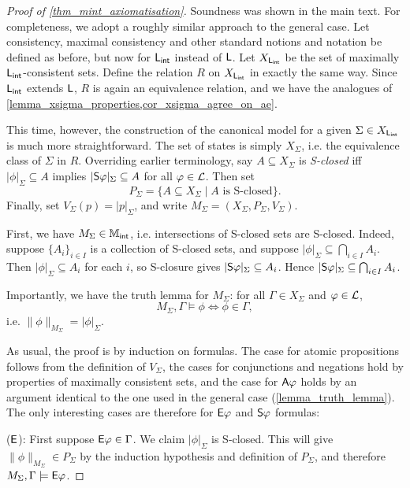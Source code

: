 \begin{proof}[Proof of \cref{thm_mint_axiomatisation}]

Soundness was shown in the main text. For completeness, we adopt a roughly
similar approach to the general case. Let consistency, maximal consistency and
other standard notions and notation be defined as before, but now for $\sLint$
instead of $\sL$. Let $X_{\sLint}$ be the set of maximally $\sLint$-consistent
sets. Define the relation $R$ on $X_{\sLint}$ in exactly the same way. Since
$\sLint$ extends $\sL$, $R$ is again an equivalence relation, and we have the
analogues of \cref{lemma_xsigma_properties,cor_xsigma_agree_on_ae}.

This time, however, the construction of the canonical model for a given
$\Sigma \in X_{\sLint}$ is much more straightforward. The set of
states is simply $X_\Sigma$, i.e. the equivalence class of
$\Sigma$ in $R$. Overriding earlier terminology, say $A
\subseteq X_\Sigma$ is \emph{S-closed} iff $|\phi|_\Sigma \subseteq A$
implies $|\S\phi|_\Sigma \subseteq A$ for all $\phi \in \cL$.
Then set
\[
    P_\Sigma = \{A \subseteq X_\Sigma \mid A \text{ is S-closed}\}.
\]
Finally, set $V_\Sigma(p) = |p|_\Sigma$, and write $M_\Sigma
= (X_\Sigma, P_\Sigma, V_\Sigma)$.

First, we have $M_\Sigma \in \Mint$, i.e. intersections of S-closed sets are
S-closed.  Indeed, suppose $\{A_i\}_{i \in I}$ is a collection of S-closed
sets, and suppose $|\phi|_\Sigma \subseteq \bigcap_{i \in I}{A_i}$. Then
$|\phi|_\Sigma \subseteq A_i$ for each $i$, so S-closure gives $|\S\phi|_\Sigma
\subseteq A_i$.  Hence $|\S\phi|_\Sigma \subseteq \bigcap_{i \in I}{A_i}$.

Importantly, we have the truth lemma for $M_\Sigma$: for all $\Gamma \in
    X_\Sigma$ and $\phi \in \cL$,
\[
    M_\Sigma, \Gamma \models \phi \iff \phi \in \Gamma,
\]
i.e. $\|\phi\|_{M_\Sigma} = |\phi|_\Sigma$.

As usual, the proof is by induction on formulas. The case for atomic
propositions follows from the definition of $V_\Sigma$, the cases for
conjunctions and negations hold by properties of maximally consistent sets,
and the case for $\A\phi$ holds by an argument identical to the one used in
the general case (\cref{lemma_truth_lemma}). The only interesting cases are
therefore for $\E\phi$ and $\S\phi$ formulas:

($\E$): First suppose $\E\phi \in \Gamma$. We claim $|\phi|_\Sigma$ is
S-closed. This will give $\|\phi\|_{M_\Sigma} \in P_\Sigma$ by the
induction hypothesis and definition of $P_\Sigma$, and therefore $M_\Sigma,
\Gamma \models \E\phi$.


\end{proof}
